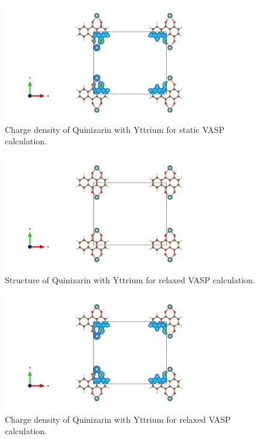 \documentclass{article}
\begin{document}
  \begin{figure}[H]
      \centering
      \includegraphics[width = 11cm]{../fig/Y_staticbefore_CHGCAR.png}
      \caption{Charge density of Quinizarin with Yttrium for static VASP calculation. }
      \label{fig:Y_staticbefore_CHGCAR}
  \end{figure}

  \begin{figure}[H]
      \centering
      \includegraphics[width = 11cm]{../fig/Y_relax_CONTCAR.png}
      \caption{Structure of Quinizarin with Yttrium for relaxed VASP calculation. }
      \label{fig:Y_relax_CONTCAR}
  \end{figure}

  \begin{figure}[H]
      \centering
      \includegraphics[width = 11cm]{../fig/Y_relax_CHGCAR.png}
      \caption{Charge density of Quinizarin with Yttrium for relaxed VASP calculation. }
      \label{fig:Y_relax_CHGCAR}
  \end{figure}
\end{document}
